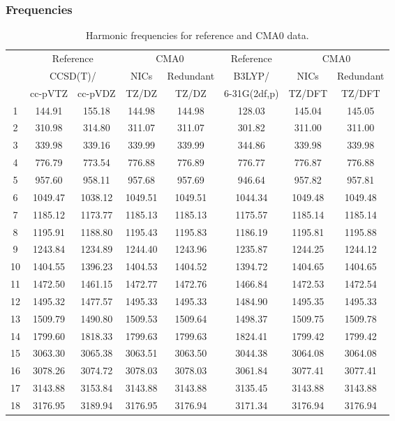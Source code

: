 \documentclass[10pt,oneside]{article}
\begin{document}
\begin{table}[h!]
\subsubsection*{Frequencies}
\centering
\caption{Harmonic frequencies for reference and CMA0 data.}
\begin{tabular}{cccccccc}
\toprule
{} & \multicolumn{2}{c}{Reference} & \multicolumn{2}{c}{CMA0} &    Reference & \multicolumn{2}{c}{CMA0} \\
{} & \multicolumn{2}{c}{CCSD(T)/} &    NICs &  Redundant &       B3LYP/ &    NICs & Redundant \\
{} &   cc-pVTZ & cc-pVDZ &   TZ/DZ &      TZ/DZ & 6-31G(2df,p) &  TZ/DFT &    TZ/DFT \\
\midrule
1  &    144.91 &  155.18 &  144.98 &     144.98 &       128.03 &  145.04 &    145.05 \\
2  &    310.98 &  314.80 &  311.07 &     311.07 &       301.82 &  311.00 &    311.00 \\
3  &    339.98 &  339.16 &  339.99 &     339.99 &       344.86 &  339.98 &    339.98 \\
4  &    776.79 &  773.54 &  776.88 &     776.89 &       776.77 &  776.87 &    776.88 \\
5  &    957.60 &  958.11 &  957.68 &     957.69 &       946.64 &  957.82 &    957.81 \\
6  &   1049.47 & 1038.12 & 1049.51 &    1049.51 &      1044.34 & 1049.48 &   1049.48 \\
7  &   1185.12 & 1173.77 & 1185.13 &    1185.13 &      1175.57 & 1185.14 &   1185.14 \\
8  &   1195.91 & 1188.80 & 1195.43 &    1195.83 &      1186.19 & 1195.81 &   1195.88 \\
9  &   1243.84 & 1234.89 & 1244.40 &    1243.96 &      1235.87 & 1244.25 &   1244.12 \\
10 &   1404.55 & 1396.23 & 1404.53 &    1404.52 &      1394.72 & 1404.65 &   1404.65 \\
11 &   1472.50 & 1461.15 & 1472.77 &    1472.76 &      1466.84 & 1472.53 &   1472.54 \\
12 &   1495.32 & 1477.57 & 1495.33 &    1495.33 &      1484.90 & 1495.35 &   1495.33 \\
13 &   1509.79 & 1490.80 & 1509.53 &    1509.64 &      1498.37 & 1509.75 &   1509.78 \\
14 &   1799.60 & 1818.33 & 1799.63 &    1799.63 &      1824.41 & 1799.42 &   1799.42 \\
15 &   3063.30 & 3065.38 & 3063.51 &    3063.50 &      3044.38 & 3064.08 &   3064.08 \\
16 &   3078.26 & 3074.72 & 3078.03 &    3078.03 &      3061.84 & 3077.41 &   3077.41 \\
17 &   3143.88 & 3153.84 & 3143.88 &    3143.88 &      3135.45 & 3143.88 &   3143.88 \\
18 &   3176.95 & 3189.94 & 3176.95 &    3176.94 &      3171.34 & 3176.94 &   3176.94 \\
\bottomrule
\end{tabular}
\end{table}
\end{document}
